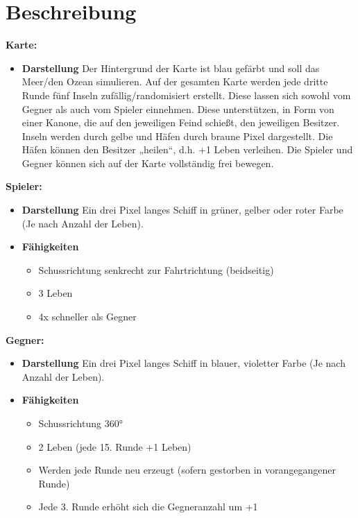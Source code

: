 \documentclass{article}
\begin{document}
\section{Beschreibung}
\textbf{Karte:}
\begin{itemize}
    \item \textbf{Darstellung}
        \newline
        Der Hintergrund der Karte ist blau gefärbt und soll das Meer/den Ozean simulieren. Auf der gesamten Karte werden jede dritte Runde fünf Inseln zufällig/randomisiert erstellt. Diese lassen sich sowohl vom Gegner als auch vom Spieler einnehmen. Diese unterstützen, in Form von einer Kanone, die auf den jeweiligen Feind schießt, den jeweiligen Besitzer. Inseln werden durch gelbe und Häfen durch braune Pixel dargestellt. Die Häfen können den Besitzer „heilen“, d.h. +1 Leben verleihen. Die Spieler und Gegner können sich auf der Karte vollständig frei bewegen.
\end{itemize}
\textbf{Spieler:}
\begin{itemize}
    \item \textbf{Darstellung}
        \newline
        Ein drei Pixel langes Schiff in grüner, gelber oder roter Farbe (Je nach Anzahl der Leben).
    \item \textbf{Fähigkeiten}
        \begin{itemize}
            \item Schussrichtung senkrecht zur Fahrtrichtung (beidseitig)
            \item 3 Leben
            \item 4x schneller als Gegner
        \end{itemize}
\end{itemize}
\textbf{Gegner:}
\begin{itemize}
    \item \textbf{Darstellung}
        \newline
        Ein drei Pixel langes Schiff in blauer, violetter Farbe (Je nach Anzahl der Leben).
    \item \textbf{Fähigkeiten}
        \begin{itemize}
            \item Schussrichtung 360°
            \item 2 Leben (jede 15. Runde +1 Leben)
            \item Werden jede Runde neu erzeugt (sofern gestorben in vorangegangener Runde)
            \item Jede 3. Runde erhöht sich die Gegneranzahl um +1
        \end{itemize}
\end{itemize}
\end{document}
